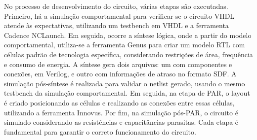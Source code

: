 No processo de desenvolvimento do circuito, várias etapas são executadas. Primeiro, há a simulação comportamental para verificar se o circuito VHDL atende às expectativas, utilizando um testbench em VHDL e a ferramenta Cadence NCLaunch. Em seguida, ocorre a síntese lógica, onde a partir do modelo comportamental, utiliza-se a ferramenta Genus para criar um modelo RTL com células padrão de tecnologia específica, considerando restrições de área, frequência e consumo de energia. A síntese gera dois arquivos: um com componentes e conexões, em Verilog, e outro com informações de atraso no formato SDF. A simulação pós-síntese é realizada para validar o netlist gerado, usando o mesmo testbench da simulação comportamental. Em seguida, na etapa de PAR, o layout é criado posicionando as células e realizando as conexões entre essas células, utilizando a ferramenta Innovus. Por fim, na simulação pós-PAR, o circuito é simulado considerando as resistências e capacitâncias parasitas. Cada etapa é fundamental para garantir o correto funcionamento do circuito.

